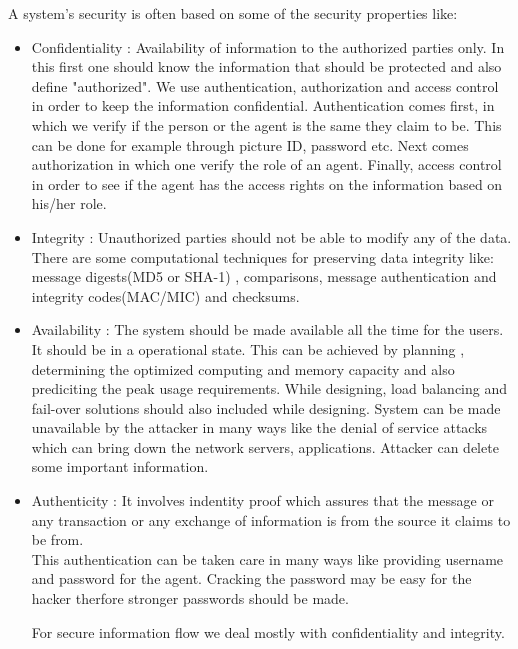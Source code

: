 A system's security is often based on some of the security properties like:
\begin{itemize}
\item  Confidentiality : Availability of information to the authorized parties only. In 
this first one should know the information that should be protected and
also define "authorized". We use authentication, authorization and access
control in order to keep the information confidential. Authentication
comes first, in which we verify if the person or the agent is the same 
they claim to be. This can be done for example through picture ID, 
password etc. Next comes authorization in which one verify the
role of an agent.  Finally, access control in order to see if 
the agent has the access rights on the information based on his/her
role.

\item Integrity : Unauthorized parties should not be able to modify any of the data.
There are some computational techniques for preserving
data integrity like: message digests(MD5 or SHA-1) , comparisons,
message authentication and integrity codes(MAC/MIC) and checksums.

\item Availability : The system should be made available 
all the time for the users. 
It should be in a operational state.
This can be achieved by planning , determining the optimized computing
and memory capacity and also prediciting the peak usage requirements.
While designing, load balancing and fail-over solutions should also 
included while designing. System can be made unavailable by the attacker
in many ways like the denial of service attacks which can bring
down the network servers, applications. Attacker can 
delete some important information.

\item Authenticity : It involves indentity proof which assures that the message or any transaction or any exchange 
of information is from the source it claims to be from.\\ This authentication
can be taken care in many ways like providing username and password
for the agent. Cracking the password may be easy for the hacker
therfore stronger passwords should be made. 

For secure information flow we deal mostly with confidentiality and integrity.


\end{itemize}


